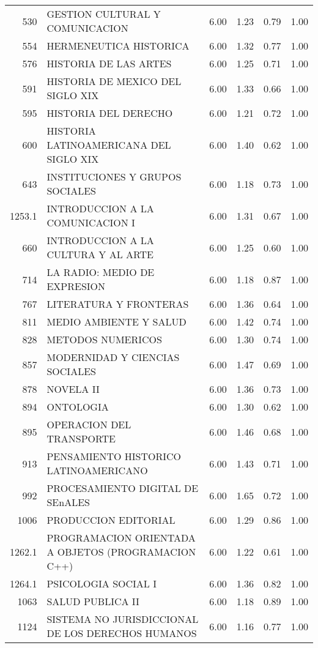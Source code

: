 \documentclass[12pt]{article}
\begin{document}
\begin{table}[ht]
\begin{tabular}{rlrrrr}
  530 & GESTION CULTURAL Y COMUNICACION & 6.00 & 1.23 & 0.79 & 1.00 \\ 
  554 & HERMENEUTICA HISTORICA & 6.00 & 1.32 & 0.77 & 1.00 \\ 
  576 & HISTORIA DE LAS ARTES & 6.00 & 1.25 & 0.71 & 1.00 \\ 
  591 & HISTORIA DE MEXICO DEL SIGLO XIX & 6.00 & 1.33 & 0.66 & 1.00 \\ 
  595 & HISTORIA DEL DERECHO & 6.00 & 1.21 & 0.72 & 1.00 \\ 
  600 & HISTORIA LATINOAMERICANA DEL SIGLO XIX & 6.00 & 1.40 & 0.62 & 1.00 \\ 
  643 & INSTITUCIONES Y GRUPOS SOCIALES & 6.00 & 1.18 & 0.73 & 1.00 \\ 
  1253.1 & INTRODUCCION A LA COMUNICACION I & 6.00 & 1.31 & 0.67 & 1.00 \\ 
  660 & INTRODUCCION A LA CULTURA Y AL ARTE & 6.00 & 1.25 & 0.60 & 1.00 \\ 
  714 & LA RADIO: MEDIO DE EXPRESION & 6.00 & 1.18 & 0.87 & 1.00 \\ 
  767 & LITERATURA Y FRONTERAS & 6.00 & 1.36 & 0.64 & 1.00 \\ 
  811 & MEDIO AMBIENTE Y SALUD & 6.00 & 1.42 & 0.74 & 1.00 \\ 
  828 & METODOS NUMERICOS & 6.00 & 1.30 & 0.74 & 1.00 \\ 
  857 & MODERNIDAD Y CIENCIAS SOCIALES & 6.00 & 1.47 & 0.69 & 1.00 \\ 
  878 & NOVELA II & 6.00 & 1.36 & 0.73 & 1.00 \\ 
  894 & ONTOLOGIA & 6.00 & 1.30 & 0.62 & 1.00 \\ 
  895 & OPERACION DEL TRANSPORTE & 6.00 & 1.46 & 0.68 & 1.00 \\ 
  913 & PENSAMIENTO HISTORICO LATINOAMERICANO & 6.00 & 1.43 & 0.71 & 1.00 \\ 
  992 & PROCESAMIENTO DIGITAL DE SEnALES & 6.00 & 1.65 & 0.72 & 1.00 \\ 
  1006 & PRODUCCION EDITORIAL & 6.00 & 1.29 & 0.86 & 1.00 \\ 
  1262.1 & PROGRAMACION ORIENTADA A OBJETOS (PROGRAMACION C++) & 6.00 & 1.22 & 0.61 & 1.00 \\ 
  1264.1 & PSICOLOGIA SOCIAL I & 6.00 & 1.36 & 0.82 & 1.00 \\ 
  1063 & SALUD PUBLICA II & 6.00 & 1.18 & 0.89 & 1.00 \\ 
  1124 & SISTEMA NO JURISDICCIONAL DE LOS DERECHOS HUMANOS & 6.00 & 1.16 & 0.77 & 1.00 \\ 

\end{tabular}
\end{table}
\end{document}
